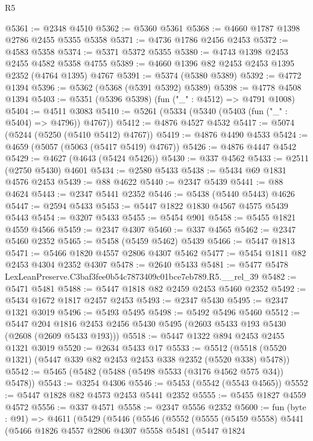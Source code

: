 \begin{lexlean}{R5}
\begin{coremodule}
@5361 := @2348 @4510
@5362 := @5360 @5361
@5368 := @4660 @1787 @1398 @2786 @2455 @5355 @5358
@5371 := @4736 @1786 @2456 @2453
@5372 := @4583 @5358
@5374 := @5371 @5372 @5355
@5380 := @4743 @1398 @2453 @2455 @4582 @5358 @4755
@5389 := @4660 @1396 @82 @2453 @2453 @1395 @2352 (@4764 @1395) @4767
@5391 := @5374 (@5380 @5389)
@5392 := @4772 @1394
@5396 := @5362 (@5368 (@5391 @5392) @5389)
@5398 := @4778 @4508 @1394
@5403 := @5351 (@5396 @5398) (fun ("_" : @4512) => @4791 @1008)
@5404 := @4511 @3083
@5410 := @5261 (@5334 (@5340 (@5403 (fun ("_" : @5404) => @4796)) @4767))
@5412 := @4876 @4527 @4532
@5417 := @5074 (@5244 (@5250 (@5410 @5412) @4767))
@5419 := @4876 @4490 @4533
@5424 := @4659 (@5057 (@5063 (@5417 @5419) @4767))
@5426 := @4876 @4447 @4542
@5429 := @4627 (@4643 (@5424 @5426))
@5430 := @337 @4562
@5433 := @2511 (@2750 @5430) @4601
@5434 := @2580 @5433
@5438 := @5434 @69 @1831 @4576 @2453
@5439 := @88 @4622
@5440 := @2347 @5439
@5441 := @88 @4624
@5443 := @2347 @5441 @2352
@5446 := @5438 (@5440 @5443) @4626
@5447 := @2594 @5433
@5453 := @5447 @1822 @1830 @4567 @4575 @5439 @5443
@5454 := @3207 @5433
@5455 := @5454 @901
@5458 := @5455 @1821 @4559 @4566
@5459 := @2347 @4307
@5460 := @337 @4565
@5462 := @2347 @5460 @2352
@5465 := @5458 (@5459 @5462) @5439
@5466 := @5447 @1813
@5471 := @5466 @1820 @4557 @2806 @4307 @5462
@5477 := @5454 @1811 @82 @2453 @4304 @2352 @4307
@5478 := @2640 @5433
@5481 := @5477 @5478 LexLeanPreserve.C3baf3fee0b54c7873409c01bce7eb789.R5.__rel_39
@5482 := @5471 @5481
@5488 := @5447 @1818 @82 @2459 @2453 @5460 @2352
@5492 := @5434 @1672 @1817 @2457 @2453
@5493 := @2347 @5430
@5495 := @2347 @1321 @3019
@5496 := @5493 @5495
@5498 := @5492 @5496 @5460
@5512 := @5447
    @204
    @1816
    @2453
    @2456
    @5430
    @5495
    (@2603 @5433 @193 @5430 (@2608 (@2609 @5433 @193)))
@5518 := @5447 @1322 @894 @2453 @2455 @1321 @3019
@5520 := @2634 @5433 @17
@5533 := @5512 (@5518 (@5520 @1321) (@5447 @339 @82 @2453 @2453 @338 @2352 (@5520 @338) @5478))
@5542 := @5465 (@5482 (@5488 (@5498 @5533 (@3176 @4562 @575 @34)) @5478))
@5543 := @3254 @4306
@5546 := @5453 (@5542 (@5543 @4565))
@5552 := @5447 @1828 @82 @4573 @2453 @5441 @2352
@5555 := @5455 @1827 @4559 @4572
@5556 := @337 @4571
@5558 := @2347 @5556 @2352
@5600 := fun (byte : @91) =>
  @4611
    (@5429
      (@5446
        (@5546
          (@5552
            (@5555
              (@5459 @5558)
              @5441
              (@5466
                @1826
                @4557
                @2806
                @4307
                @5558
                @5481
                (@5447
                  @1824

\end{coremodule}
\end{lexlean}
